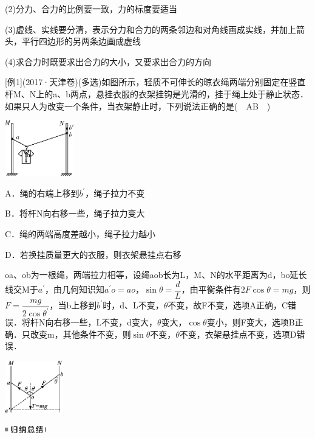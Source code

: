 \documentclass[cn,10.5pt,chinese,mac,chinesefont=founder]{elegantbook}
\begin{document}
(2)分力、合力的比例要一致，力的标度要适当

(3)虚线、实线要分清，表示分力和合力的两条邻边和对角线画成实线，并加上箭头，平行四边形的另两条边画成虚线

(4)求合力时既要求出合力的大小，又要求出合力的方向

{[}例1{]}(2017·天津卷)(多选)如图所示，轻质不可伸长的晾衣绳两端分别固定在竖直杆M、N上的a、b两点，悬挂衣服的衣架挂钩是光滑的，挂于绳上处于静止状态．如果只人为改变一个条件，当衣架静止时，下列说法正确的是(　AB　)

\begin{center}\includegraphics[width=1.17708in,height=0.94792in]{media/image68.png}\end{center}

A．绳的右端上移到$b^{'}$，绳子拉力不变

B．将杆N向右移一些，绳子拉力变大

C．绳的两端高度差越小，绳子拉力越小

D．若换挂质量更大的衣服，则衣架悬挂点右移
\begin{solution}
	oa、ob为一根绳，两端拉力相等，设绳aob长为L，M、N的水平距离为d，bo延长线交M于$a^{'}$，由几何知识知$a^{'}o=ao$，$\sin\theta=\dfrac{d}{L}$，由平衡条件有$2F\cos\theta=mg$，则$F=\dfrac{mg}{2\cos\theta^{'}}$，当b上移到$b^{'}$时，d、L不变，$\theta$不变，故F不变，选项A正确，C错误．将杆N向右移一些，L不变，d变大，$\theta$变大，$\cos\theta$变小，则F变大，选项B正确．只改变m，其他条件不变，则$\sin\theta$不变，$\theta$不变，衣架悬挂点不变，选项D错误．
\end{solution}


\begin{center}\includegraphics[width=1in,height=0.88542in]{media/image69.png}\end{center}
\begin{center}\includegraphics[width=0.70833in,height=0.125in]{media/image13.png}\end{center}
\end{document}
